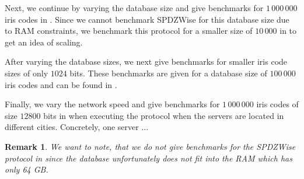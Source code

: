 \documentclass[a4paper,11pt,
]{article}
\newtheorem{remark}{Remark}
\begin{document}
Next, we continue by varying the database size and give benchmarks for $1\,000\,000$ iris codes in . Since we cannot benchmark SPDZWise for this database size due to RAM constraints, we benchmark this protocol for a smaller size of $10\,000$ in  to get an idea of scaling.

After varying the database sizes, we next give benchmarks for smaller iris code sizes of only $1024$ bits. These benchmarks are given for a database size of $100\,000$ iris codes and can be found in .

Finally, we vary the network speed and give benchmarks for $1\,000\,000$ iris codes of size $12800$ bits in  when executing the protocol when the servers are located in different cities. Concretely, one server ... 

\begin{remark}
    We want to note, that we do not give benchmarks for the SPDZWise protocol in  since the database unfortunately does not fit into the RAM which has only 64 GB.
\end{remark}
\end{document}
